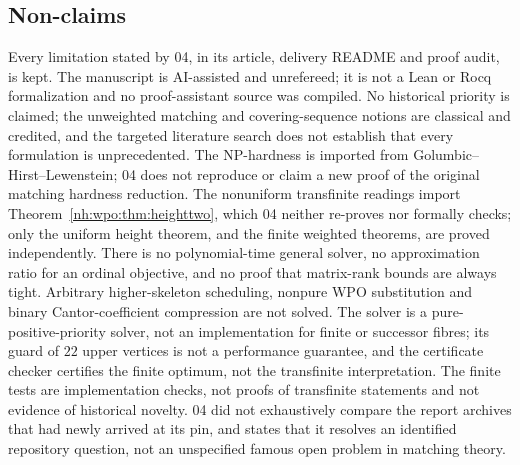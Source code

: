 \documentclass[11pt,a4paper]{article}
\theoremstyle{definition}
\theoremstyle{remark}
\begin{document}
\subsection{Non-claims}
Every limitation stated by 04, in its article, delivery README and proof
audit, is kept. The manuscript is AI-assisted and unrefereed; it is not a Lean
or Rocq formalization and no proof-assistant source was compiled. No
historical priority is claimed; the unweighted matching and covering-sequence
notions are classical and credited, and the targeted literature search does
not establish that every formulation is unprecedented. The NP-hardness is
imported from Golumbic--Hirst--Lewenstein; 04 does not reproduce or claim a new
proof of the original matching hardness reduction. The nonuniform transfinite
readings import Theorem~\ref{nh:wpo:thm:heighttwo}, which 04 neither re-proves
nor formally checks; only the uniform height theorem, and the finite weighted
theorems, are proved independently. There is no polynomial-time general
solver, no approximation ratio for an ordinal objective, and no proof that
matrix-rank bounds are always tight. Arbitrary higher-skeleton scheduling,
nonpure WPO substitution and binary Cantor-coefficient compression are not
solved. The solver is a pure-positive-priority solver, not an implementation
for finite or successor fibres; its guard of $22$ upper vertices is not a
performance guarantee, and the certificate checker certifies the finite
optimum, not the transfinite interpretation. The finite tests are
implementation checks, not proofs of transfinite statements and not evidence
of historical novelty. 04 did not exhaustively compare the report archives
that had newly arrived at its pin, and states that it resolves an identified
repository question, not an unspecified famous open problem in matching
theory.
\end{document}
